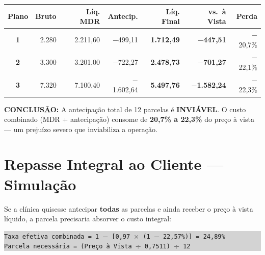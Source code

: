 \documentclass[12pt, a4paper]{article}
\begin{document}
\begin{table}[H]
    \centering
    \footnotesize
    \renewcommand{\arraystretch}{1.4}
    \begin{tabularx}{\textwidth}{c r r r r r r}
        \toprule
        \rowcolor{tableHeader} \textbf{Plano} & \textbf{Bruto} & \textbf{Líq. MDR} & \textbf{Antecip.} & \textbf{Líq. Final} & \textbf{vs.\ à Vista} & \textbf{Perda} \\
        \midrule
        \textbf{1} & 2.280 & 2.211,60 & $-$499,11 & \textbf{1.712,49} & \textcolor{dangerRed}{\textbf{$-$447,51}} & $-$20,7\% \\
        \rowcolor{lightGray}
        \textbf{2} & 3.300 & 3.201,00 & $-$722,27 & \textbf{2.478,73} & \textcolor{dangerRed}{\textbf{$-$701,27}} & $-$22,1\% \\
        \textbf{3} & 7.320 & 7.100,40 & $-$1.602,64 & \textbf{5.497,76} & \textcolor{dangerRed}{\textbf{$-$1.582,24}} & $-$22,3\% \\
        \bottomrule
    \end{tabularx}
\end{table}

\textcolor{dangerRed}{\textbf{CONCLUSÃO:}} A antecipação total de 12 parcelas é \textbf{INVIÁVEL}. O custo combinado (MDR + antecipação) consome de \textbf{20,7\% a 22,3\%} do preço à vista — um prejuízo severo que inviabiliza a operação.

\needspace{8cm}

\section{Repasse Integral ao Cliente — Simulação}

Se a clínica quisesse antecipar \textbf{todas} as parcelas e ainda receber o preço à vista líquido, a parcela precisaria absorver o custo integral:

\begin{center}
\colorbox{lightGray}{%
    \parbox{0.85\textwidth}{%
        \vspace{0.3cm}
        \texttt{Taxa efetiva combinada = 1 $-$ [0,97 $\times$ (1 $-$ 22,57\%)] = 24,89\%} \\
        \vspace{0.1cm}
        \texttt{Parcela necessária = (Preço à Vista $\div$ 0,7511) $\div$ 12} \\
        \vspace{0.3cm}
    }%
}
\end{center}
\end{document}
